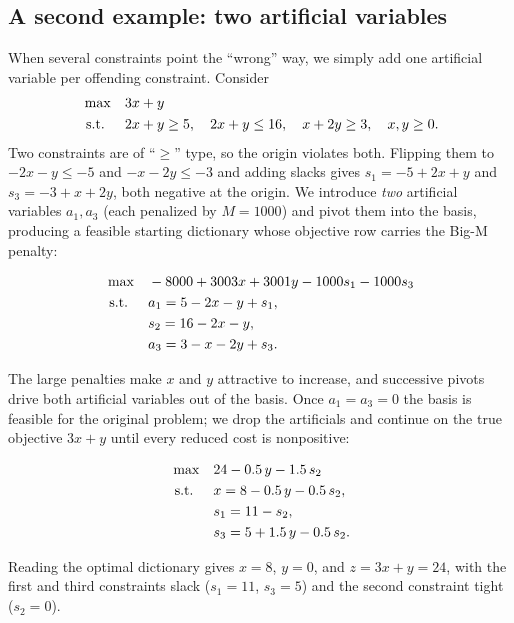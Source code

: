 \subsection{A second example: two artificial variables}

When several constraints point the ``wrong'' way, we simply add one artificial variable per offending constraint. Consider
\[
\begin{aligned}
\max\quad & 3x + y \\
\text{ s.t. }\quad & 2x + y \geq 5,\quad 2x + y \leq 16,\quad x + 2y \geq 3,\quad x,y \geq 0.
\end{aligned}
\]
Two constraints are of ``$\ge$'' type, so the origin violates both. Flipping them to $-2x-y\le-5$ and $-x-2y\le-3$ and adding slacks gives $s_1 = -5 + 2x + y$ and $s_3 = -3 + x + 2y$, both negative at the origin. We introduce \emph{two} artificial variables $a_1,a_3$ (each penalized by $M=1000$) and pivot them into the basis, producing a feasible starting dictionary whose objective row carries the Big-M penalty:
\begin{center}\begin{dict}
\[
\begin{aligned}
\max\quad & -8000 + 3003x + 3001y - 1000s_1 - 1000s_3 \\
\text{ s.t. }\quad & a_1 = 5 - 2x - y + s_1,\\
& s_2 = 16 - 2x - y,\\
& a_3 = 3 - x - 2y + s_3.
\end{aligned}
\]
\end{dict}\end{center}
The large penalties make $x$ and $y$ attractive to increase, and successive pivots drive both artificial variables out of the basis. Once $a_1=a_3=0$ the basis is feasible for the original problem; we drop the artificials and continue on the true objective $3x+y$ until every reduced cost is nonpositive:
\begin{center}\begin{dictopt}
\[
\begin{aligned}
\max\quad & 24 - 0.5\,y - 1.5\,s_2 \\
\text{ s.t. }\quad & x = 8 - 0.5\,y - 0.5\,s_2,\\
& s_1 = 11 - s_2,\\
& s_3 = 5 + 1.5\,y - 0.5\,s_2.
\end{aligned}
\]
\end{dictopt}\end{center}
Reading the optimal dictionary gives $x = 8$, $y = 0$, and $z = 3x + y = 24$, with the first and third constraints slack ($s_1=11$, $s_3=5$) and the second constraint tight ($s_2=0$).

